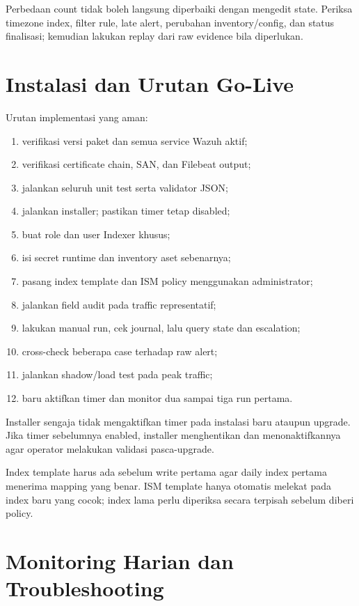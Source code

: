\documentclass[11pt,a4paper,oneside]{report}
\begin{document}
Perbedaan count tidak boleh langsung diperbaiki dengan mengedit state. Periksa
timezone index, filter rule, late alert, perubahan inventory/config, dan status
finalisasi; kemudian lakukan replay dari raw evidence bila diperlukan.

\chapter{Instalasi dan Urutan Go-Live}

Urutan implementasi yang aman:

\begin{enumerate}
  \item verifikasi versi paket dan semua service Wazuh aktif;
  \item verifikasi certificate chain, SAN, dan Filebeat output;
  \item jalankan seluruh unit test serta validator JSON;
  \item jalankan installer; pastikan timer tetap disabled;
  \item buat role dan user Indexer khusus;
  \item isi secret runtime dan inventory aset sebenarnya;
  \item pasang index template dan ISM policy menggunakan administrator;
  \item jalankan field audit pada traffic representatif;
  \item lakukan manual run, cek journal, lalu query state dan escalation;
  \item cross-check beberapa case terhadap raw alert;
  \item jalankan shadow/load test pada peak traffic;
  \item baru aktifkan timer dan monitor dua sampai tiga run pertama.
\end{enumerate}

Installer sengaja tidak mengaktifkan timer pada instalasi baru ataupun upgrade.
Jika timer sebelumnya enabled, installer menghentikan dan menonaktifkannya agar
operator melakukan validasi pasca-upgrade.

Index template harus ada sebelum write pertama agar daily index pertama menerima
mapping yang benar. ISM template hanya otomatis melekat pada index baru yang cocok;
index lama perlu diperiksa secara terpisah sebelum diberi policy.

\chapter{Monitoring Harian dan Troubleshooting}
\end{document}

